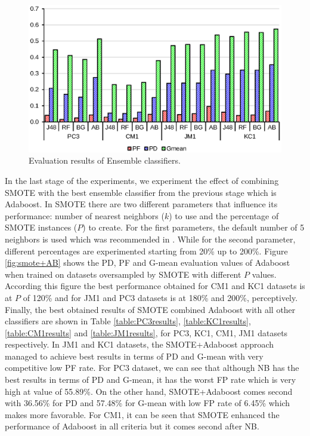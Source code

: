 \documentclass[runningheads,a4paper]{llncs}
\begin{document}
\begin{figure}[h]
\label{fig:ss}
\begin{center}
\includegraphics[scale=0.7]{Ensembles.eps}
\caption{Evaluation results of Ensemble classifiers.}
\end{center}
\label{fig:ensembles}
\end{figure}

In the last stage of the experiments, we experiment the effect of combining SMOTE with the best ensemble classifier from the previous stage which is Adaboost. In SMOTE there are two different parameters that influence its performance: number of nearest neighbors ($k$) to use and the percentage of SMOTE instances ($P$) to create. For the first parameters, the default number of 5 neighbors is used which was recommended in \cite{chawla2002smote}. While for the second parameter, different percentages are experimented starting from 20\% up to 200\%. Figure \ref{fig:smote+AB} shows the PD, PF and G-mean evaluation values of Adaboost when trained on datasets oversampled by SMOTE with different $P$ values. According this figure the best performance obtained for CM1 and KC1 datasets is at $P$ of 120\% and for JM1 and PC3 datasets is at 180\% and 200\%, perceptively. Finally, the best obtained results of SMOTE combined Adaboost with all other classifiers are shown in Table \ref{table:PC3results}, \ref{table:KC1results}, \ref{table:CM1results} and \ref{table:JM1results}, for PC3, KC1, CM1, JM1 datasets respectively. In JM1 and KC1 datasets, the SMOTE+Adaboost approach managed to achieve best results in terms of PD and G-mean with very competitive low PF rate. For PC3 dataset, we can see that although NB has the best results in terms of PD and G-mean, it has the worst FP rate which is very high at value of 55.89\%. On the other hand, SMOTE+Adaboost comes second with 36.56\%  for PD and 57.48\% for G-mean with low FP rate of 6.45\% which makes more favorable. For CM1, it can be seen that SMOTE enhanced the performance of Adaboost in all criteria but it comes second after NB. 
\end{document}
